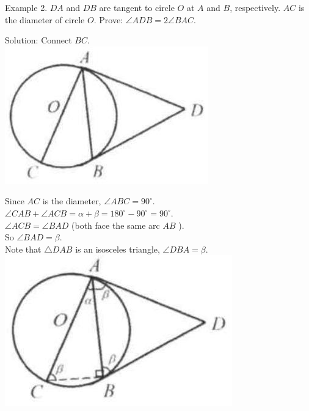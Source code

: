 \documentclass[10pt]{article}
\begin{document}
Example 2. \(D A\) and \(D B\) are tangent to circle \(O\) at \(A\) and \(B\), respectively. \(A C\) is the diameter of circle \(O\). Prove: \(\angle A D B=2 \angle B A C\).

Solution:
Connect \(B C\).\\
\includegraphics[max width=\textwidth, center]{2025_04_17_97bc1f7e44d93c271a88g-163(2)}

Since \(A C\) is the diameter, \(\angle A B C=90^{\circ}\).\\
\(\angle C A B+\angle A C B=\alpha+\beta=180^{\circ}-90^{\circ}=90^{\circ}\).\\
\(\angle A C B=\angle B A D\) (both face the same arc \(A B\) ).\\
So \(\angle B A D=\beta\).\\
Note that \(\triangle D A B\) is an isosceles triangle, \(\angle D B A=\beta\).\\
\includegraphics[max width=\textwidth, center]{2025_04_17_97bc1f7e44d93c271a88g-163(4)}
\end{document}
